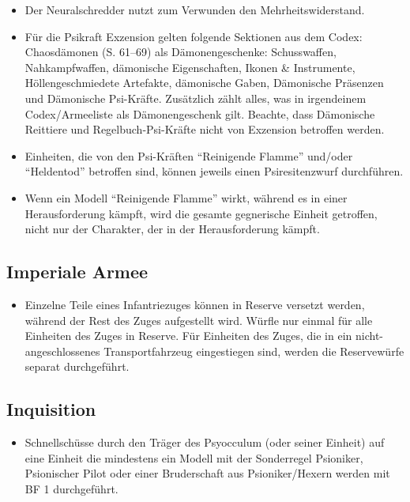 \begin{itemize}

 \item Der Neuralschredder nutzt zum Verwunden den Mehrheitswiderstand.

 \item  Für die Psikraft Exzension gelten folgende Sektionen aus dem Codex:
  Chaosdämonen (S. 61–69) als Dämonengeschenke: Schusswaffen, Nahkampfwaffen,
  dämonische Eigenschaften, Ikonen \& Instrumente, Höllengeschmiedete Artefakte,
  dämonische Gaben, Dämonische Präsenzen und Dämonische Psi-Kräfte. Zusätzlich
  zählt alles, was in irgendeinem Codex/Armeeliste als Dämonengeschenk gilt.
  Beachte, dass Dämonische Reittiere und Regelbuch-Psi-Kräfte nicht von
  Exzension betroffen werden.

 \item Einheiten, die von den Psi-Kräften ``Reinigende Flamme'' und/oder
  ``Heldentod'' betroffen sind, können jeweils einen Psiresitenzwurf
  durchführen.

 \item Wenn ein Modell ``Reinigende Flamme'' wirkt, während es in einer
  Herausforderung kämpft, wird die gesamte gegnerische Einheit getroffen, nicht
  nur der Charakter, der in der Herausforderung kämpft.

\end{itemize}

\subsection{Imperiale Armee}

\begin{itemize}

 \item Einzelne Teile eines Infantriezuges können in Reserve versetzt werden,
  während der Rest des Zuges aufgestellt wird. Würfle nur einmal für alle
  Einheiten des Zuges in Reserve. Für Einheiten des Zuges, die in ein
  nicht-angeschlossenes Transportfahrzeug eingestiegen sind, werden die
  Reservewürfe separat durchgeführt.

\end{itemize}

\subsection{Inquisition}

\begin{itemize}

 \item Schnellschüsse durch den Träger des Psyocculum (oder seiner Einheit) auf
  eine Einheit die mindestens ein Modell mit der Sonderregel Psioniker,
  Psionischer Pilot oder einer Bruderschaft aus Psioniker/Hexern werden mit BF 1
  durchgeführt.

\end{itemize}

